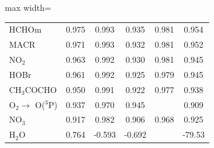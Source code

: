 \documentclass[journal abbreviation, manuscript]{copernicus}
\begin{document}
\begin{table}
\begin{adjustbox}{max width=\textheight}
\begin{tabular}{|lccccc|}
HCHOm         & 0.975 & 0.993 & 0.935 & 0.981 & 0.954 \\
MACR          & 0.971 & 0.993 & 0.932 & 0.981 & 0.952 \\
NO$_2$        & 0.963 & 0.992 & 0.930 & 0.981 & 0.945 \\
HOBr          & 0.961 & 0.992 & 0.925 & 0.979 & 0.945 \\
CH$_3$COCHO   & 0.950 & 0.991 & 0.922 & 0.977 & 0.938 \\
O$_2 \rightarrow$ O($^3$P) & 0.937 & 0.970 & 0.945 & & 0.909 \\
NO$_3$        & 0.917 & 0.982 & 0.906 & 0.968 & 0.925 \\
H$_2$O        & 0.764 & -0.593 & -0.692 &     & -79.53 \\
\bottomrule
\end{tabular}
\end{adjustbox}
\label{Table R2}
\end{table}
\end{document}
